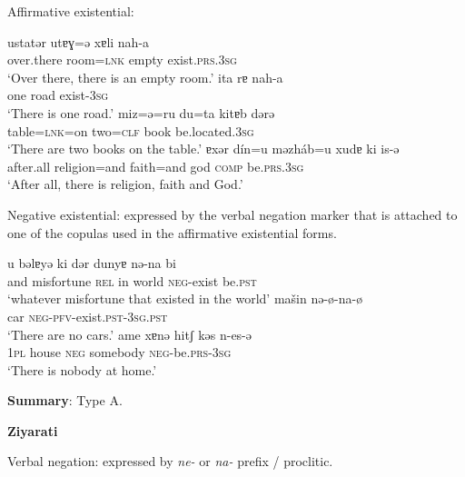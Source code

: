 \documentclass[output=paper]{langsci/langscibook}
\begin{document}
\begin{unindented}
Affirmative existential:
%
\begin{exe}\ex \gll ustatər utɐɣ=ə xɐli nah-a \\
over.there  room=\textsc{lnk}  empty exist.\textsc{prs.3sg} \\
    \glt `Over there, there is an empty room.' \parencite[310]{RastorguevaKerimova2012}
\ex \gll ita   rɐ    nah-a \\
one road exist-\textsc{3sg} \\
    \glt `There is one road.' \parencite[318]{RastorguevaKerimova2012}
\ex \gll miz=ə=ru du=ta kitɐb dərə \\
table=\textsc{lnk}=on  two=\textsc{clf}   book be.located.\textsc{3sg} \\
    \glt `There are two books on the table.' \parencite[134]{RastorguevaKerimova2012}
\ex \gll ɐxər dín=u məzháb=u xudɐ ki is-ə \\
after.all religion=and faith=and   god   \textsc{comp}    be.\textsc{prs.3sg} \\
    \glt `After all, there is religion, faith and God.' \parencite[275]{RastorguevaKerimova2012} 
    \end{exe}

Negative existential: expressed by the verbal negation marker that is attached to one of the copulas used in the affirmative existential forms.
%
\begin{exe}\ex \gll u bəlɐyə ki dər dunyɐ nə-na bi \\
and misfortune \textsc{rel}  in   world \textsc{neg}-exist   be.\textsc{pst} \\
    \glt `whatever misfortune that existed in the world'\parencite[263]{RastorguevaKerimova2012}
\ex \gll mašin nə-ø-na-ø \\
car \textsc{neg}-\textsc{pfv}-exist.\textsc{pst-3sg.pst} \\
    \glt `There are no cars.' \parencite[326, their glosses and zeroes]{RastorguevaKerimova2012}
\ex \gll ame xɐnə   hitʃ   kəs n-es-ə \\
\textsc{1pl} house \textsc{neg} somebody \textsc{neg}-be.\textsc{prs-3sg}\\
    \glt `There is nobody at home.' \parencite[133]{RastorguevaKerimova2012} 
    \end{exe} 

\textbf{Summary}: Type A.

\textbf{Ziyarati} \citep{ShokriJahani2013} 

Verbal negation: expressed by \textit{ne-} or \textit{na-} prefix / proclitic.


\end{unindented}
\end{document}
